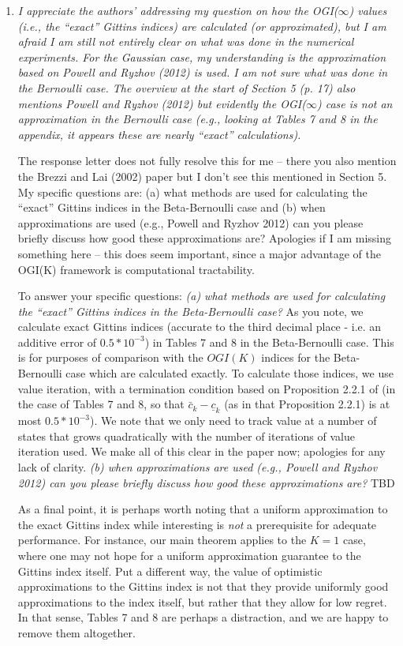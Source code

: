 \documentclass[11pt]{article}
\newcommand{\1}{\ensuremath{\mathbf{1}}} %
\theoremstyle{thm-sf}
\begin{document}
	
	\begin{enumerate}
		
		\item {\it I appreciate the authors’ addressing my question on how the OGI($\infty$) values (i.e., the “exact” Gittins indices) are calculated (or approximated), but I am afraid I am still not entirely clear on what was done in the numerical experiments. For the Gaussian case, my understanding is the approximation based on Powell and Ryzhov (2012) is used. I am not sure what was done in the Bernoulli case. The overview at the start of Section 5 (p. 17) also mentions Powell and Ryzhov (2012) but evidently the OGI($\infty$) case is not an approximation in the Bernoulli case (e.g., looking at Tables 7 and 8 in the appendix, it appears these are nearly “exact” calculations).
			
		The response letter does not fully resolve this for me – there you also mention the Brezzi and Lai (2002) paper but I don’t see this mentioned in Section 5. My specific questions are: (a) what methods are used for calculating the “exact” Gittins indices in the Beta-Bernoulli case and (b) when approximations are used (e.g., Powell and Ryzhov 2012) can you please briefly discuss how good these approximations are?
		Apologies if I am missing something here – this does seem important, since a major advantage of the OGI(K) framework is computational tractability.
		}

To answer your specific questions: {\em (a) what methods are used for calculating the “exact” Gittins indices in the Beta-Bernoulli case?} As you note, we calculate exact Gittins indices (accurate to the third decimal place - i.e. an additive error of $0.5*10^{-3}$) in Tables 7 and 8 in the Beta-Bernoulli case. This is for purposes of comparison with the $OGI(K)$ indices for the Beta-Bernoulli case which are calculated exactly. To calculate those indices, we use value iteration, with a termination condition based on Proposition 2.2.1 of \cite{.} (in the case of Tables 7 and 8, so that $\bar{c}_k - \underline{c}_k$ (as in that Proposition 2.2.1) is at most $0.5*10^{-3}$). We note that we only need to track value at a number of states that grows quadratically with the number of iterations of value iteration used. We make all of this clear in the paper now; apologies for any lack of clarity. {\em (b) when approximations are used (e.g., Powell and Ryzhov 2012) can you please briefly discuss how good these approximations are?} TBD

As a final point, it is perhaps worth noting that a uniform approximation to the exact Gittins index while interesting is {\em not} a prerequisite for adequate performance. For instance, our main theorem applies to the $K=1$ case, where one may not hope for a uniform approximation guarantee to the Gittins index itself. Put a different way, the value of optimistic approximations to the Gittins index is not that they provide uniformly good approximations to the index itself, but rather that they allow for low regret. In that sense, Tables 7 and 8 are perhaps a distraction, and we are happy to remove them altogether. 


\end{enumerate}
\end{document}
